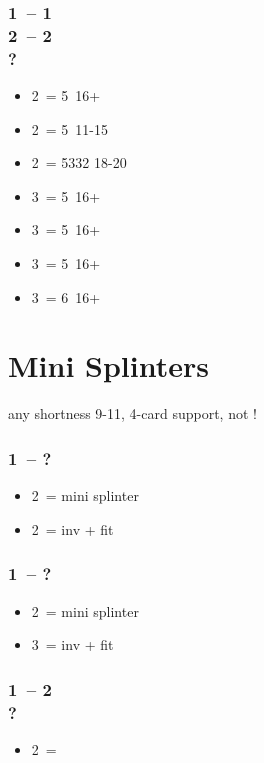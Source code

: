 \subsubsection*{1\spades\ -- 1\ntx\ \\ 2\clubs\ -- 2\diams \\ ?}
\begin{itemize}
    \item 2\hearts\ = 5\hearts\ 16+
    \item 2\spades\ = 5\clubs\ 11-15
    \item 2\ntx\ = 5332 18-20
    \item 3\clubs\ = 5\clubs\ 16+
    \item 3\diams\ = 5\diams\ 16+
    \item 3\hearts\ = 5\hearts\ 16+
    \item 3\spades\ = 6\spades\ 16+
\end{itemize}

\section{\texorpdfstring{Mini Splinters}{miniSplinter}}\label{sec:miniSplinter}

any shortness 9-11, 4-card support, not \gf!

\subsubsection*{1\hearts\ -- ?}
\begin{itemize}
    \item 2\spades\ = mini splinter
    \item 2\nt\ = inv + fit
\end{itemize}

\subsubsection*{1\spades\ -- ?}
\begin{itemize}
    \item 2\nt\ = mini splinter
    \item 3\hearts\ = inv + fit
\end{itemize}

\subsubsection*{1\hearts\ -- 2\spades \\ ?}
\begin{itemize}
    \item 2\nt\ = \lsf
\end{itemize}

